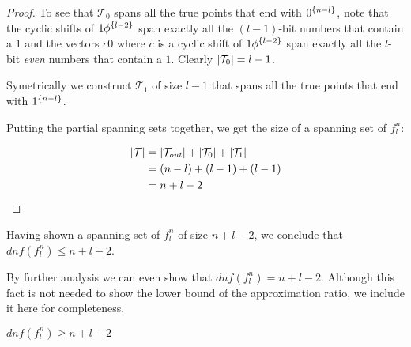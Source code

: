 \begin{proof}
To see that $\mathcal{T}_0$ spans all the true points
that end with $0^{\{n-l\}}$,
note that the cyclic shifts of $1 \phi^{\{l-2\}}$
span exactly all the $(l-1)$-bit numbers
that contain a $1$
and the vectors $c 0$
where $c$ is a cyclic shift of $1 \phi^{\{l-2\}}$
span exactly all the $l$-bit \emph{even} numbers
that contain a $1$.
Clearly $\lvert\mathcal{T}_0\rvert = l-1$.

Symetrically we construct $\mathcal{T}_1$ of size $l-1$
that spans all the true points
that end with $1^{\{n-l\}}$.

Putting the partial spanning sets together,
we get the size of a spanning set of $f_l^n$:

\begin{align*}
\lvert\mathcal{T}\rvert
&= \lvert\mathcal{T}_{\mathit{out}}\rvert
+ \lvert\mathcal{T}_0\rvert + \lvert\mathcal{T}_1\rvert \\
&= (n-l) + (l-1) + (l-1) \\
&= n + l - 2
\end{align*}
\end{proof}

Having shown a spanning set of $f_l^n$ of size $n+l-2$,
we conclude that $dnf(f_l^n) \leq n+l-2$.

By further analysis we can even show that $dnf(f^n_l)=n+l-2$.
Although this fact is not needed to show the lower bound of the approximation ratio,
we include it here for completeness.

\begin{lemma}
$dnf(f_l^n) \geq n+l-2$
\end{lemma}


